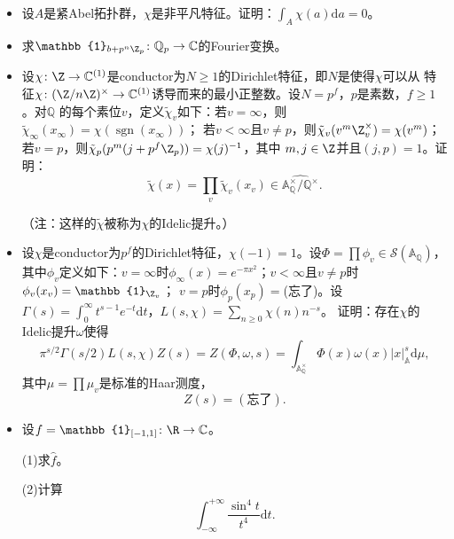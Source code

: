 \newcommand{\C}{\mathbb{C}}
\newcommand{\Q}{\mathbb{Q}}
\begin{itemize}
    \item[一、] 设$A$是紧Abel拓扑群，$\chi$是非平凡特征。证明：$\displaystyle \int_A \chi(a) \mathrm{d}a = 0$。
    \item[二、]求$\mathbb{1}_{b+p^n\Z_p} \colon \Q_p \to \C$的Fourier变换。
    \item[三、]设$\chi \colon \Z \to \C^{(1)}$是conductor为$N \geqslant 1$的Dirichlet特征，即$N$是使得$\chi$可以从
    特征$\chi \colon (\Z/n\Z)^\times \to \C^{(1)}$诱导而来的最小正整数。设$N = p^f$，$p$是素数，$f \geqslant 1$。对$\Q$
    的每个素位$v$，定义$\tilde{\chi}_v$如下：若$v = \infty$，则$\tilde{\chi}_{\infty}(x_\infty) = \chi(\operatorname{sgn}(x_\infty))$；
    若$v < \infty$且$v \neq p$，则$\tilde{\chi}_v(v^m\Z_v^\times) = \chi(v^m)$；若$v = p$，则$\tilde{\chi}_p(p^m(j+p^f\Z_p)) = \chi(j)^{-1}$，其中
    $m,j \in \Z$并且$(j,p) = 1$。证明：\[\tilde{\chi}(x) = \prod_v \tilde{\chi}_v(x_v) \in \widehat{\mathbb{A}_\Q^\times/\Q^\times}.\]

    （注：这样的$\tilde{\chi}$被称为$\chi$的Idelic提升。）
    \item[四、]设$\chi$是conductor为$p^f$的Dirichlet特征，$\chi(-1) = 1$。设$\Phi = \prod \phi_v \in \mathcal{S}(\mathbb{A}_\Q)$，
    其中$\phi_v$定义如下：$v = \infty$时$\phi_\infty(x) = e^{-\pi x^2}$；$v < \infty$且$v \neq p$时$\phi_v(x_v) = \mathbb{1}_{\Z_v}$；
    $v = p$时$\phi_p(x_p) = $(忘了)。设$\displaystyle \Gamma(s) = \int_0^\infty t^{s-1}e^{-t}\mathrm{d}t$，$L(s,\chi) = \sum\limits_{n \geqslant 0} \chi(n)n^{-s}$。
    证明：存在$\chi$的Idelic提升$\omega$使得\[\pi^{s/2}\Gamma(s/2)L(s,\chi)Z(s) = Z(\Phi,\omega,s) = \int_{\mathbb{A}_\Q^\times} \Phi(x)\omega(x)|x|_{\mathbb{A}}^s \mathrm{d}\mu,\]
    其中$\mu = \prod \mu_v$是标准的Haar测度，\[Z(s) = (\text{忘了}).\]
    \item[五、]设$f = \mathbb{1}_{[-1,1]} \colon \R \to \C$。

    (1)求$\hat{f}$。

    (2)计算\[\int_{-\infty}^{+\infty} \frac{\sin^4 t}{t^4} \mathrm{d}t.\]
\end{itemize}
